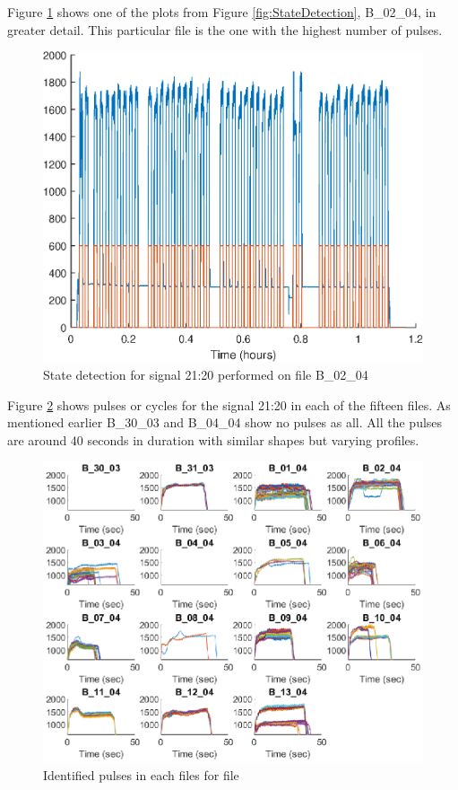 \documentclass[]{article}
\begin{document}
Figure \ref{fig:StateDetectionFig_B_02_04} shows one of the plots from Figure \ref{fig:StateDetection}, B\_02\_04, in greater detail. This particular file is the one with the highest number of pulses.

\begin{figure}[H]
    \centering
    \includegraphics[scale=0.75]{figures/StateDetectionFig_B_02_04.eps}
    \caption{State detection for signal 21:20 performed on file B\_02\_04}
    \label{fig:StateDetectionFig_B_02_04}
\end{figure}

Figure \ref{fig:IdentifiedPulses} shows pulses or cycles for the signal 21:20 in each of the fifteen files. As mentioned earlier B\_30\_03 and B\_04\_04 show no pulses as all. All the pulses are around 40 seconds in duration with similar shapes but varying profiles.
 
\begin{figure}[H]
    \centering
    \includegraphics[width=\textwidth, height=\textheight, keepaspectratio]{figures/IdentifiedPulsesFig.eps}
    \caption{Identified pulses in each files for file}
    \label{fig:IdentifiedPulses}
\end{figure}
\end{document}
